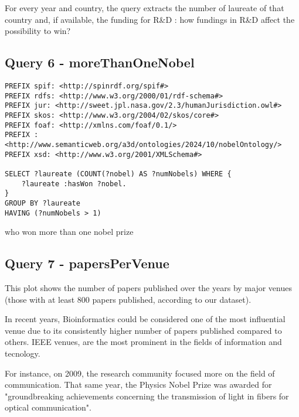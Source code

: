 \documentclass{article}
\begin{document}
For every year and country, the query extracts the number of laureate of that country and, if available, the funding for R\&D : how fundings in R\&D affect the possibility to win?
 
\subsection*{Query 6 - moreThanOneNobel}

\begin{lstlisting}
PREFIX spif: <http://spinrdf.org/spif#>
PREFIX rdfs: <http://www.w3.org/2000/01/rdf-schema#>
PREFIX jur: <http://sweet.jpl.nasa.gov/2.3/humanJurisdiction.owl#>
PREFIX skos: <http://www.w3.org/2004/02/skos/core#>
PREFIX foaf: <http://xmlns.com/foaf/0.1/>
PREFIX : <http://www.semanticweb.org/a3d/ontologies/2024/10/nobelOntology/>
PREFIX xsd: <http://www.w3.org/2001/XMLSchema#>

SELECT ?laureate (COUNT(?nobel) AS ?numNobels) WHERE {
    ?laureate :hasWon ?nobel.
}
GROUP BY ?laureate
HAVING (?numNobels > 1)    
\end{lstlisting}

who won more than one nobel prize

\subsection*{Query 7 - papersPerVenue}
This plot shows the number of papers published over the years by major
venues (those with at least 800 papers published, according to our dataset).

In recent years, Bioinformatics could be considered one of the most influential
venue due to its consistently higher number of papers published compared to others.
IEEE venues, are the most prominent in the fields of information and tecnology.

For instance, on 2009, the research community focused more on the field of
communication.
That same year, the Physics Nobel Prize was awarded for "groundbreaking achievements
concerning the transmission of light in fibers for optical communication".
\end{document}
